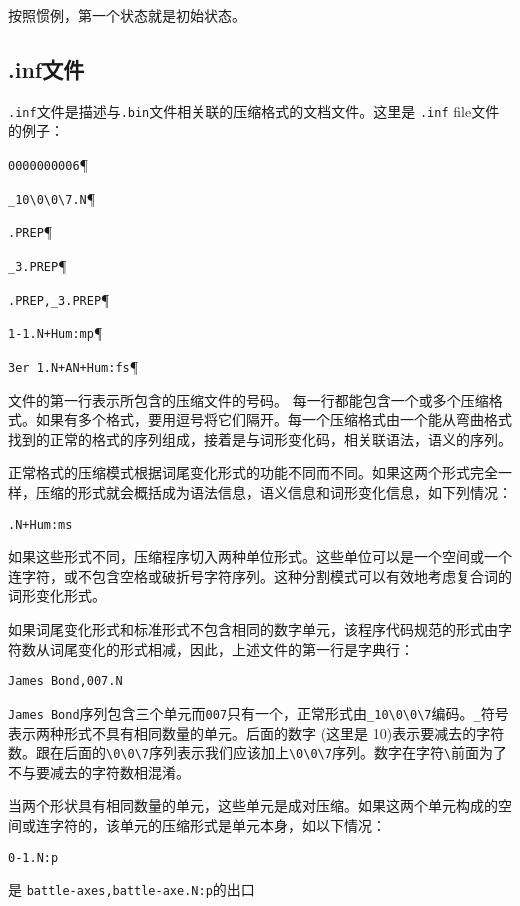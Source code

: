 \bigskip
\noindent
按照惯例，第一个状态就是初始状态。


\subsection{.inf文件}
 \verb+.inf+文件是描述与\verb+.bin+文件相关联的压缩格式的文档文件。这里是 \verb+.inf+ file文件的例子：

\bigskip
\verb$0000000006$\P

\verb$_10\0\0\7.N$\P

\verb$.PREP$\P

\verb$_3.PREP$\P

\verb$.PREP,_3.PREP$\P

\verb$1-1.N+Hum:mp$\P

\verb$3er 1.N+AN+Hum:fs$\P

\bigskip
\noindent 
文件的第一行表示所包含的压缩文件的号码。
每一行都能包含一个或多个压缩格式。如果有多个格式，要用逗号将它们隔开。每一个压缩格式由一个能从弯曲格式找到的正常的格式的序列组成，接着是与词形变化码，相关联语法，语义的序列。


\bigskip
\noindent 
正常格式的压缩模式根据词尾变化形式的功能不同而不同。如果这两个形式完全一样，压缩的形式就会概括成为语法信息，语义信息和词形变化信息，如下列情况：

\bigskip
\verb$.N+Hum:ms$

\bigskip
\noindent
如果这些形式不同，压缩程序切入两种单位形式。这些单位可以是一个空间或一个连字符，或不包含空格或破折号字符序列。这种分割模式可以有效地考虑复合词的词形变化形式。


\bigskip
\noindent
如果词尾变化形式和标准形式不包含相同的数字单元，该程序代码规范的形式由字符数从词尾变化的形式相减，因此，上述文件的第一行是字典行：


\bigskip
\verb+James Bond,007.N+

\bigskip
\noindent
\verb+James Bond+序列包含三个单元而\verb+007+只有一个，正常形式由\verb+_10\0\0\7+编码。\verb+_+符号表示两种形式不具有相同数量的单元。后面的数字 (这里是 10)表示要减去的字符数。跟在后面的\verb+\0\0\7+序列表示我们应该加上\verb+\0\0\7+序列。数字在字符\verb+\+前面为了不与要减去的字符数相混淆。



\bigskip
\noindent 
当两个形状具有相同数量的单元，这些单元是成对压缩。如果这两个单元构成的空间或连字符的，该单元的压缩形式是单元本身，如以下情况：


\bigskip
\verb$0-1.N:p$

\bigskip
\noindent 是 \verb$battle-axes,battle-axe.N:p$的出口

